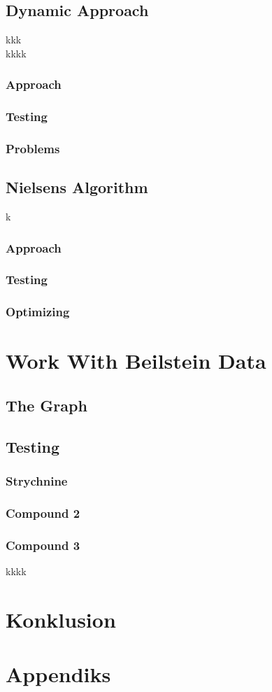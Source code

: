 \documentclass[a4paper,10pt,titlepage]{paper}
\begin{document}
\subsection{Dynamic Approach}
kkk \cite{Carsten}\\
kkkk \cite{Fagerberg}\\

\subsubsection{Approach}
\subsubsection{Testing}
\subsubsection{Problems}

\subsection{Nielsens Algorithm}
k \cite{Nielsen}
\subsubsection{Approach}
\subsubsection{Testing}
\subsubsection{Optimizing}

\section{Work With Beilstein Data}
\subsection{The Graph}
\subsection{Testing}
\subsubsection{Strychnine}
\subsubsection{Compound 2} 
\subsubsection{Compound 3}
kkkk \cite{SynthesisPlans}\\

\section{Konklusion}

\newpage

\printbibliography[type=book, title={Books}]
\printbibliography[type=article, title={Articles}]
\printbibliography[nottype=book, nottype=article, title={Other}]

\newpage
\section{Appendiks}
\end{document}
